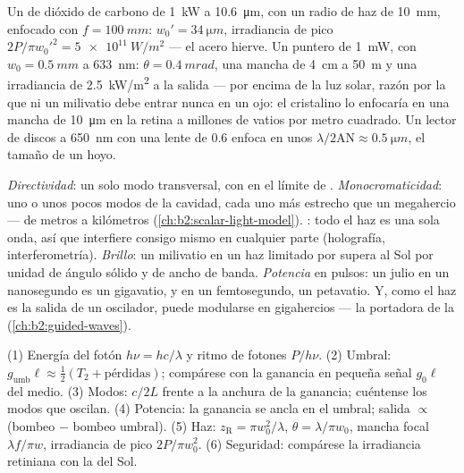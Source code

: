 \begin{example}\label{ex:b2:laser:focus}
Un  de dióxido de carbono de \qty{1}{kW} a \qty{10.6}{\micro m}, con un radio de haz de
\qty{10}{mm}, enfocado con $f = \qty{100}{mm}$: $w_0' = \qty{34}{\micro m}$,
irradiancia de pico $2P/\pi w_0'^2 = \qty{5e11}{W/m^2}$ --- el acero hierve.
Un puntero de \qty{1}{mW}, con $w_0 = \qty{0.5}{mm}$ a \qty{633}{nm}: $\theta =
\qty{0.4}{mrad}$, una mancha de \qty{4}{cm} a \qty{50}{m} y una irradiancia de
\qty{2.5}{kW/m^2} a la salida --- por encima de la luz solar, razón por la que ni
un milivatio debe entrar nunca en un ojo: el cristalino lo enfocaría en una
mancha de \qty{10}{\micro m} en la retina a millones de vatios por metro
cuadrado. Un lector de discos a \qty{650}{nm} con una lente de 
$0.6$ enfoca en unos $\lambda/2\mathrm{AN} \approx \qty{0.5}{\micro m}$,
el tamaño de un hoyo.
\end{example}

\begin{remark}\label{rem:b2:laser:special}
\emph{Directividad}: un solo modo transversal, con  en el límite
de . \emph{Monocromaticidad}: uno o unos pocos modos de la cavidad, cada
uno más estrecho que un megahercio ---  de metros a kilómetros
(\cref{ch:b2:scalar-light-model}). \emph{}: todo el
haz es una sola onda, así que interfiere consigo mismo en cualquier parte (holografía,
interferometría). \emph{Brillo}: un milivatio en un haz limitado por 
supera al Sol por unidad de ángulo sólido y de ancho de banda. \emph{Potencia}
en pulsos: un julio en un nanosegundo es un gigavatio, y en un femtosegundo, un
petavatio. Y, como el haz es la salida de un oscilador, puede
modularse en gigahercios --- la portadora de la 
(\cref{ch:b2:guided-waves}).
\end{remark}

\begin{method}\label{meth:b2:laser:method}
(1) Energía del fotón $h\nu = hc/\lambda$ y ritmo de fotones $P/h\nu$.
(2) Umbral: $g_{\text{umb}}\ell \approx \tfrac12(T_2 + \text{pérdidas})$;
compárese con la ganancia en pequeña señal $g_0\ell$ del medio.
(3) Modos: $c/2L$ frente a la anchura de la ganancia; cuéntense los modos que oscilan.
(4) Potencia: la ganancia se ancla en el umbral; salida $\propto$ (bombeo $-$
bombeo umbral). (5) Haz: $z_{\text{R}} = \pi w_0^2/\lambda$, $\theta =
\lambda/\pi w_0$, mancha focal $\lambda f/\pi w$, irradiancia de pico
$2P/\pi w_0^2$. (6) Seguridad: compárese la irradiancia retiniana con la
del Sol.
\end{method}

